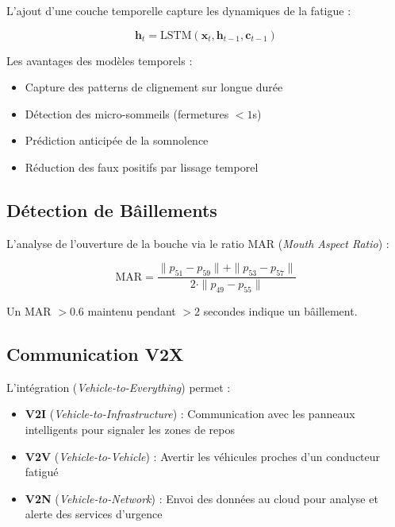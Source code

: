 L'ajout d'une couche temporelle capture les dynamiques de la fatigue :

\begin{equation}
\mathbf{h}_t = \text{LSTM}(\mathbf{x}_t, \mathbf{h}_{t-1}, \mathbf{c}_{t-1})
\label{eq:lstm}
\end{equation}

Les avantages des modèles temporels :
\begin{itemize}
    \item Capture des patterns de clignement sur longue durée
    \item Détection des micro-sommeils (fermetures $< 1$s)
    \item Prédiction anticipée de la somnolence
    \item Réduction des faux positifs par lissage temporel
\end{itemize}

\subsection{Détection de Bâillements}

L'analyse de l'ouverture de la bouche via le ratio MAR (\textit{Mouth Aspect Ratio}) :

\begin{equation}
\text{MAR} = \frac{\|p_{51} - p_{59}\| + \|p_{53} - p_{57}\|}{2 \cdot \|p_{49} - p_{55}\|}
\label{eq:mar}
\end{equation}

Un MAR $> 0.6$ maintenu pendant $> 2$ secondes indique un bâillement.

\subsection{Communication V2X}

L'intégration  (\textit{Vehicle-to-Everything}) permet :
\begin{itemize}
    \item \textbf{V2I} (\textit{Vehicle-to-Infrastructure}) : Communication avec les panneaux intelligents pour signaler les zones de repos
    \item \textbf{V2V} (\textit{Vehicle-to-Vehicle}) : Avertir les véhicules proches d'un conducteur fatigué
    \item \textbf{V2N} (\textit{Vehicle-to-Network}) : Envoi des données au cloud pour analyse et alerte des services d'urgence
\end{itemize}

